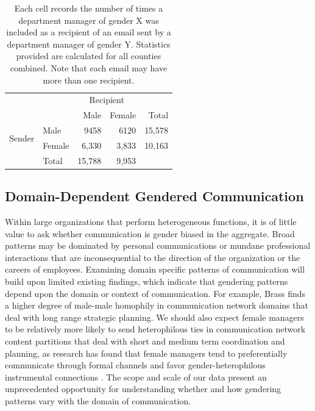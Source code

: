 \documentclass{pnastwo}
\begin{document}
\begin{article}
	\begin{table}
	\centering
	\begin{tabular}{rlrrr}
	  \toprule
		 && \multicolumn{2}{c}{Recipient} \\
		\cmidrule{3-4}
	& & Male & Female & Total  \\
		 \midrule
		\multirow{2}{*}{Sender} & Male &  9458 & 6120  & 15,578 \\
	& Female & 6,330 & 3,833 & 10,163 \\
	\midrule
		 & Total & 15,788 & 9,953 & \\
		\bottomrule
		\end{tabular}
		\caption{\label{tab:gender email agg stats}Each cell records the number of times a department manager of gender X was included as a recipient of an email sent by a department manager of gender Y. Statistics provided are calculated for all counties combined. Note that each email may have more than one recipient.}
	\end{table}

\subsection{Domain-Dependent Gendered Communication}
Within large organizations that perform heterogeneous functions, it is of little value to ask whether communication is gender biased in the aggregate. Broad patterns may be dominated by personal communications or mundane professional interactions that are inconsequential to the direction of the organization or the careers of employees. Examining domain specific patterns of communication will build upon limited existing findings, which indicate that gendering patterns depend upon the domain or context of communication. For example, Brass \citep{Brass1985} finds a higher degree of male-male homophily in communication network domains that deal with long range strategic planning. We should also expect female managers to be relatively more likely to send heterophilous ties in communication network content partitions that deal with short and medium term coordination and planning, as research has found that female managers tend to preferentially communicate through formal channels  \citep{Ragins1989} and favor gender-heterophilous instrumental connections \citep{Ibarra1992}. The scope and scale of our data present an unprecedented opportunity for understanding whether and how gendering patterns vary with the domain of communication.


\end{article}
\end{document}
